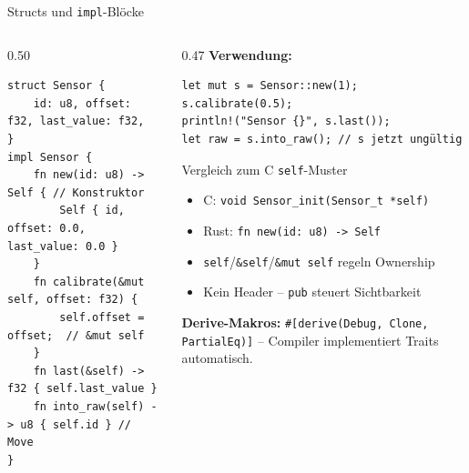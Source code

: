 \documentclass[%
  aspectratio=169,
  10pt
]{beamer}
\begin{document}
\begin{frame}[fragile]{Structs und \texttt{impl}-Blöcke}
  \begin{columns}[T]
    \begin{column}{0.50\textwidth}
\begin{lstlisting}
struct Sensor {
    id: u8, offset: f32, last_value: f32,
}
impl Sensor {
    fn new(id: u8) -> Self { // Konstruktor
        Self { id, offset: 0.0, last_value: 0.0 }
    }
    fn calibrate(&mut self, offset: f32) {
        self.offset = offset;  // &mut self
    }
    fn last(&self) -> f32 { self.last_value }
    fn into_raw(self) -> u8 { self.id } // Move
}
\end{lstlisting}
    \end{column}
    \begin{column}{0.47\textwidth}
      \textbf{Verwendung:}
\begin{lstlisting}
let mut s = Sensor::new(1);
s.calibrate(0.5);
println!("Sensor {}", s.last());
let raw = s.into_raw(); // s jetzt ungültig
\end{lstlisting}
      \begin{block}{Vergleich zum C \texttt{self}-Muster}
        \small
        \begin{itemize}
          \item C: \texttt{void Sensor\_init(Sensor\_t *self)}
          \item Rust: \texttt{fn new(id: u8) -> Self}
          \item \texttt{self}/\texttt{\&self}/\texttt{\&mut self}
                regeln Ownership
          \item Kein Header -- \texttt{pub} steuert Sichtbarkeit
        \end{itemize}
      \end{block}
      {\small\textbf{Derive-Makros:}
      \texttt{\#[derive(Debug, Clone, PartialEq)]} --
      Compiler implementiert Traits automatisch.}
    \end{column}
  \end{columns}
\end{frame}
\end{document}
